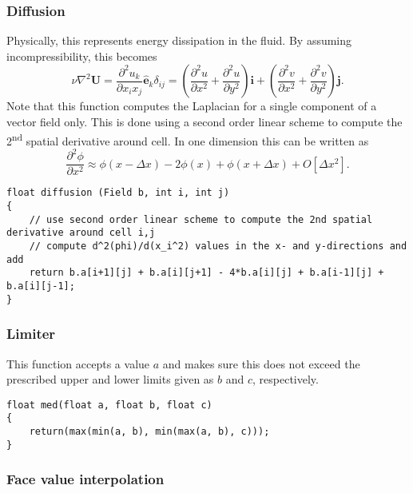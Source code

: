 \documentclass[notitlepage]{article}
\begin{document}
\subsubsection{Diffusion}

Physically, this represents energy dissipation in the fluid. By assuming incompressibility, this
becomes
%
\begin{equation}
\nu \nabla^2 \mathbf{U} = \frac{\partial^2 u_k}{\partial x_i x_j} \mathbf{\hat{e}}_k \delta_{ij} = 
	\left( \frac{\partial^2 u}{\partial x^2} + \frac{\partial^2 u}{\partial y^2} \right) \mathbf{i}
	+\left( \frac{\partial^2 v}{\partial x^2} + \frac{\partial^2 v}{\partial y^2} \right) \mathbf{j} .
\end{equation}
%
Note that this function computes the Laplacian for a single component of a vector field only.
This is done using a second order linear scheme to compute the 2\textsuperscript{nd} spatial derivative around cell.
In one dimension this can be written as
%
\begin{equation}
\frac{\partial^2 \phi}{\partial x^2} \approx \phi(x-\Delta x) -2 \phi(x) + \phi(x + \Delta x) + O[\Delta x^2] .
\end{equation}

\begin{lstlisting}[style=myCpp]
float diffusion (Field b, int i, int j)
{
	// use second order linear scheme to compute the 2nd spatial derivative around cell i,j
	// compute d^2(phi)/d(x_i^2) values in the x- and y-directions and add
	return b.a[i+1][j] + b.a[i][j+1] - 4*b.a[i][j] + b.a[i-1][j] + b.a[i][j-1];
}
\end{lstlisting}

\subsubsection{Limiter}

This function accepts a value $a$ and makes sure this does not exceed the prescribed
upper and lower limits given as $b$ and $c$, respectively.

\begin{lstlisting}[style=myCpp]
float med(float a, float b, float c)
{
	return(max(min(a, b), min(max(a, b), c)));
}
\end{lstlisting}

\subsubsection{Face value interpolation}
\end{document}
